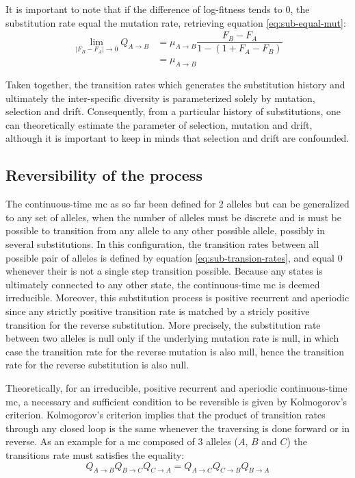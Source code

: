 It is important to note that if the difference of log-fitness tends to $0$, the \gls{substitution} rate equal the mutation rate, retrieving equation \ref{eq:sub-equal-mut}:
\begin{align}
\lim_{|F_{B} - F_{A}| \to 0} Q_{A \to B} & = \mu_{A \to B}   \dfrac{F_{B} - F_{A}}{{1 - (1 + {F_{A} - F_{B}}) }} \nonumber \\
& =  \mu_{A \to B} 
\end{align}


Taken together, the {transition} rates which generates the \gls{substitution} history and ultimately the inter-specific diversity is parameterized solely by mutation, selection and drift.
Consequently, from a particular history of \glspl{substitution}, one can theoretically estimate the parameter of selection, mutation and drift, although it is important to keep in minds that selection and drift are confounded.

\subsection{Reversibility of the process}
The continuous-time \gls{mc} as so far been defined for $2$ \glspl{allele} but can be generalized to any set of \glspl{allele}, when the number of \glspl{allele} must be discrete and is must be possible to {transition} from any \gls{allele} to any other possible \gls{allele}, possibly in several \glspl{substitution}.
In this configuration, the {transition} rates between all possible pair of \glspl{allele} is defined by equation \ref{eq:sub-transion-rates}, and equal $0$ whenever their is not a single step {transition} possible.
Because any states is ultimately connected to any other state, the continuous-time \gls{mc} is deemed irreducible.
Moreover, this \gls{substitution} process is positive recurrent and aperiodic since any strictly positive {transition} rate is matched by a stricly positive {transition} for the reverse \gls{substitution}.
More precisely, the \gls{substitution} rate between two \glspl{allele} is null only if the underlying mutation rate is null, in which case the {transition} rate for the reverse mutation is also null, hence the {transition} rate for the reverse \gls{substitution} is also null.

Theoretically, for an irreducible, positive recurrent and aperiodic continuous-time \gls{mc}, a necessary and sufficient condition to be reversible is given by Kolmogorov's criterion.
Kolmogorov's criterion implies that the product of {transition} rates through any closed loop is the same whenever the traversing is done forward or in reverse.
As an example for a \gls{mc} composed of $3$ \glspl{allele} ($A$, $B$ and $C$) the {transitions} rate must satisfies the equality:
\begin{equation}
Q_{A \to B}Q_{B \to C}Q_{C \to A} = Q_{A \to C}Q_{C \to B}Q_{B \to A}
\end{equation}

